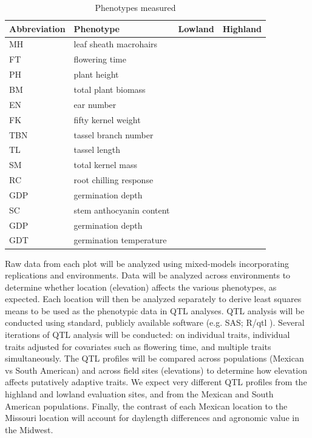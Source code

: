 \begin{table}
\begin{center}
\caption{Phenotypes measured}\label{tab:phenos}
\begin{tabular}{llcc}\\\toprule  
{\bf Abbreviation} & {\bf Phenotype} & {\bf Lowland} & {\bf Highland } \\\midrule
MH & leaf sheath macrohairs & & \\
FT & flowering time & & \\
PH & plant height 			& & \\
BM & total plant biomass 	& & \\
EN & ear number			& & \\
FK & fifty kernel weight & & \\
TBN & tassel branch number & &\\
TL & tassel length & &\\
SM & total kernel mass & &\\
RC & root chilling response & &\\
GDP & germination depth & &\\
SC & stem anthocyanin content & &\\
GDP & germination depth & &\\
GDT & germination temperature & &\\\bottomrule
\end{tabular}
\end{center}
\end{table} 

Raw data from each plot will be analyzed using mixed-models incorporating replications and environments.  Data will be analyzed across environments to determine whether location (elevation) affects the various phenotypes, as expected.  Each location will then be analyzed separately to derive least squares means to be used as the phenotypic data in QTL analyses.  QTL analysis will be conducted using standard, publicly available software (e.g. SAS; R/qtl \citealp{Broman2003a}).  Several iterations of QTL analysis will be conducted: on individual traits, individual traits adjusted for covariates such as flowering time, and multiple traits simultaneously.  The QTL profiles will be compared across populations (Mexican vs South American) and across field sites (elevations) to determine how elevation affects putatively adaptive traits.  We expect very different QTL profiles from the highland and lowland evaluation sites, and from the Mexican and South American populations.  Finally, the contrast of each Mexican location to the Missouri location will account for daylength differences and agronomic value in the Midwest. 

